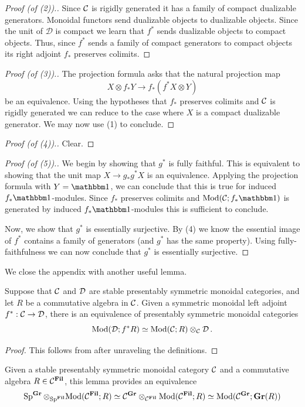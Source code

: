 \begin{proof}[Proof (of (2)).]
  Since $\mathcal{C}$ is rigidly generated it has a family of compact dualizable generators.
  Monoidal functors send dualizable objects to dualizable objects.
  Since the unit of $\mathcal{D}$ is compact we learn that $f^*$ sends dualizable objects to compact objects.
  Thus, since $f^*$ sends a family of compact generators to compact objects its right adjoint $f_*$ preserves colimits.
\end{proof}

\begin{proof}[Proof (of (3)).]
  The projection formula asks that the natural projection map
  \[ X \otimes f_*Y \to f_*(f^*X \otimes Y) \]
  be an equivalence.
  Using the hypotheses that $f_*$ preserves colimits and $\mathcal{C}$ is rigidly generated we can reduce to the case where $X$ is a compact dualizable generator. 
  We may now use (1) to conclude.
\end{proof}

\begin{proof}[Proof (of (4)).]
  Clear.
\end{proof}

\begin{proof}[Proof (of (5)).]
  We begin by showing that $g^*$ is fully faithful.
  This is equivalent to showing that the unit map
  $X \to g_*g^*X$ is an equivalence.
  Applying the projection formula with $Y = \o$, we can conclude that this is true for induced $f_*\o$-modules.
  Since $f_*$ preserves colimits and $\Mod( \CC ; f_*\o)$ is generated by induced $f_*\o$-modules this is sufficient to conclude.

  Now, we show that $g^*$ is essentially surjective.
  By (4) we know the essential image of $f^*$ contains a family of generators (and $g^*$ has the same property).
  Using fully-faithfulness we can now conclude that $g^*$ is essentially surjective.  
\end{proof}

We close the appendix with another useful lemma.

\begin{lem} \label{lem:tensor-mod}
  Suppose that $\mathcal{C}$ and $\operatorname{\mathcal{D}}$ are stable presentably symmetric monoidal categories, and let $R$ be a commutative algebra in $\mathcal{C}$.
  Given a symmetric monoidal left adjoint $f^* : \mathcal{C} \to \mathcal{D}$, 
  there is an equivalence of presentably symmetric monoidal categories
  \[\mathrm{Mod}(\operatorname{\mathcal{D}}; f^*R) \simeq \mathrm{Mod}(\mathcal{C}; R) \otimes_{\mathcal{C}} \operatorname{\mathcal{D}}.\]
\end{lem}

\begin{proof}
  This follows from \cite[Theorem 4.8.5.16]{HA} after unraveling the definitions.
\end{proof}

\begin{exm}  
  Given a stable presentably symmetric monoidal category $\mathcal{C}$ and a commutative algebra $R \in \mathcal{C}^{\operatorname{\mathbf{Fil}}}$, this lemma provides an equivalence
  \[ \operatorname{\mathrm{Sp}}^{\operatorname{\mathbf{Gr}}} \otimes_{\operatorname{\mathrm{Sp}}^{\operatorname{\mathbf{Fil}}}} \mathrm{Mod} ( \mathcal{C}^{\operatorname{\mathbf{Fil}}} ; R ) \simeq \mathcal{C}^{\operatorname{\mathbf{Gr}}} \otimes_{\mathcal{C}^{\operatorname{\mathbf{Fil}}}} \mathrm{Mod} ( \mathcal{C}^{\operatorname{\mathbf{Fil}}} ; R ) \simeq \mathrm{Mod} ( \mathcal{C}^{\operatorname{\mathbf{Gr}}} ; \operatorname{\mathbf{Gr}}(R) ) \]
\end{exm}
